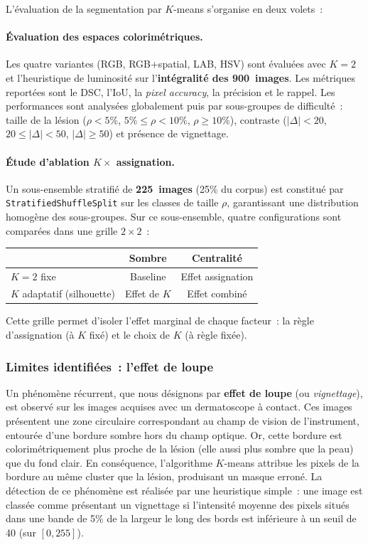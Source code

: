 \documentclass[12pt,a4paper]{article}
\begin{document}
L'évaluation de la segmentation par $K$-means s'organise en deux volets~:

\paragraph{Évaluation des espaces colorimétriques.} Les quatre variantes (RGB, RGB+spatial, LAB, HSV) sont évaluées avec $K = 2$ et l'heuristique de luminosité sur l'\textbf{intégralité des 900~images}. Les métriques reportées sont le DSC, l'IoU, la \emph{pixel accuracy}, la précision et le rappel. Les performances sont analysées globalement puis par sous-groupes de difficulté~: taille de la lésion ($\rho < 5\%$, $5\% \leq \rho < 10\%$, $\rho \geq 10\%$), contraste ($|\Delta| < 20$, $20 \leq |\Delta| < 50$, $|\Delta| \geq 50$) et présence de vignettage.

\paragraph{Étude d'ablation $K \times$ assignation.} Un sous-ensemble stratifié de \textbf{225~images} (25\% du corpus) est constitué par \texttt{StratifiedShuffleSplit} sur les classes de taille $\rho$, garantissant une distribution homogène des sous-groupes. Sur ce sous-ensemble, quatre configurations sont comparées dans une grille $2 \times 2$~:
\begin{center}
\small
\begin{tabular}{l c c}
\toprule
 & \textbf{Sombre} & \textbf{Centralité} \\
\midrule
$K = 2$ fixe & Baseline & Effet assignation \\
$K$ adaptatif (silhouette) & Effet de $K$ & Effet combiné \\
\bottomrule
\end{tabular}
\end{center}
Cette grille permet d'isoler l'effet marginal de chaque facteur~: la règle d'assignation (à $K$ fixé) et le choix de $K$ (à règle fixée).

\subsubsection{Limites identifiées~: l'effet de loupe}
\label{subsubsec:loupe}

Un phénomène récurrent, que nous désignons par \textbf{effet de loupe} (ou \emph{vignettage}), est observé sur les images acquises avec un dermatoscope à contact. Ces images présentent une zone circulaire correspondant au champ de vision de l'instrument, entourée d'une bordure sombre hors du champ optique. Or, cette bordure est colorimétriquement plus proche de la lésion (elle aussi plus sombre que la peau) que du fond clair. En conséquence, l'algorithme $K$-means attribue les pixels de la bordure au même cluster que la lésion, produisant un masque erroné. La détection de ce phénomène est réalisée par une heuristique simple~: une image est classée comme présentant un vignettage si l'intensité moyenne des pixels situés dans une bande de 5\% de la largeur le long des bords est inférieure à un seuil de 40 (sur $[0, 255]$).
\end{document}
